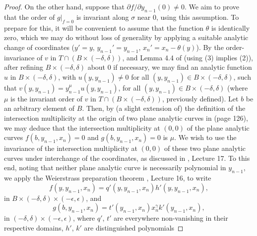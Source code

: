 \documentclass{article}
\begin{document}
\begin{proof}
    On the other hand,  suppose that 
    $\partial f/\partial y_{n-1}(0)\neq 0$.
    We aim to prove that the order of $g|_{f=0}$ is invariant along 
    $\sigma$ near $0$, using this assumption.
    To prepare for this, it will be convenient to
    assume that the function $\theta$ is identically zero,
    which we may do without loss of generality by applying a suitable
    analytic change of coordinates ($y' = y$, $y_{n-1}' = y_{n-1}$,
    $x_n' = x_n - \theta(y)$).
    By the order-invariance of $v$ in 
    $T \cap (B \times (-\delta, \delta))$, and
    Lemma 4.4 of \cite{MPP2019} (using (3) implies (2)), 
    after refining $B \times (-\delta, \delta)$ about $0$
    if necessary, we may find 
    an analytic function $u$ in $B \times (-\delta, \delta)$, 
    with $u(y, y_{n-1}) \neq 0$
    for all $(y, y_{n-1}) \in B \times (-\delta, \delta)$, such that
    $v(y, y_{n-1}) = y_{n-1}^\mu u(y, y_{n-1})$,
    for all $(y, y_{n-1}) \in B \times (-\delta, \delta)$ 
    (where $\mu$ is the invariant order of $v$ in 
    $T \cap (B \times (-\delta, \delta))$, previously defined).
    Let $b$ be an arbitrary element of $B$.
    Then, by (a slight extension of) 
    the definition of the intersection multiplicity at the origin
    of two plane analytic curves in \cite{Abhyankar1990} (page 126), we may deduce that the intersection multiplicity at $(0,0)$ 
    of the plane analytic curves 
    $f(b, y_{n-1}, x_n) = 0$ and $g(b, y_{n-1}, x_n) = 0$ is $\mu$.
    We wish to use the invariance of the intersection multiplicity 
    at $(0,0)$ of these two plane analytic curves under 
    interchange of the
    coordinates, as discussed in \cite{Abhyankar1990}, Lecture 17.
    To this end, noting that neither plane analytic curve is necessarily
    polynomial in $y_{n-1}$, we apply the Weierstrass preparation
    theorem \cite{Abhyankar1990}, Lecture 16, to write
    \[f(y, y_{n-1}, x_n) = q'(y, y_{n-1}, x_n) h'(y, y_{n-1}, x_n),\]
    in $B \times (-\delta, \delta) \times (-\epsilon, \epsilon)$, and
    \begin{equation}
    \label{Weierstrass for g}
    g(b, y_{n-1}, x_n) = t'(y_{n-1}, x_n) x_n^\gamma k'(y_{n-1},x_n),
    \end{equation}
    in $(-\delta, \delta) \times (-\epsilon, \epsilon)$,
    where $q'$, $t'$ are everywhere non-vanishing 
    in their respective domains,
    $h'$, $k'$ are distinguished polynomials 

\end{proof}
\end{document}
